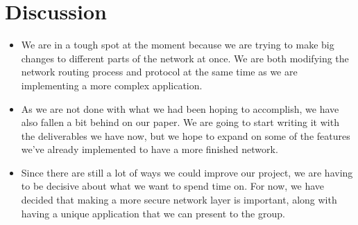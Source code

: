 \documentclass{article}
\begin{document}
\section*{Discussion}
\begin{itemize}
    \item We are in a tough spot at the moment because we are trying to make big changes to different parts of the network at once. We are both modifying
    the network routing process and protocol at the same time as we are implementing a more complex application.
    \item As we are not done with what we had been hoping to accomplish, we have also fallen a bit behind on our paper. We are going to start
    writing it with the deliverables we have now, but we hope to expand on some of the features we've already implemented to have a more finished
    network.
    \item Since there are still a lot of ways we could improve our project, we are having to be decisive about what we want to spend time on. For now,
    we have decided that making a more secure network layer is important, along with having a unique application that we can present to the group.    
\end{itemize}

\end{document}
